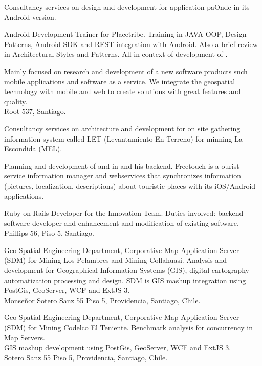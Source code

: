 \documentclass[11pt,letterpaper,roman]{moderncv}
\begin{document}
	 {\scd} {\paonde} {\stgo} {}
	{Consultancy services on design and development for application paOnde
in its Android version.} 

	 {\tchr} {\placetribe} {\stgo} {}
	{Android Development Trainer for Placetribe. Training in JAVA
	OOP, Design Patterns, Android SDK and REST integration with Android. Also a
	brief review in Architectural Styles and Patterns. All in context of development
	of \placetribeapp.}

	 {\cf} {\ingennia} {\stgo} {}
	{Mainly focused on research and development of a new software products
	such mobile applications and software as a service. We integrate the geospatial
	technology with mobile and web to create solutions with great features and
	quality. \\ Root 537, Santiago.}

	 {\scd} {\jobbitgames} {\stgo} {}
	{Consultancy services on architecture and development for on site
gathering information system called LET (Levantamiento En Terreno) for minning
La Escondida (MEL).} 

	 {\scd} {\mataveri} {\stgo} {}
	{Planning and development of \freetouchchile and \freetouchperu in
	\android and his backend.  Freetouch is a ourist service information manager and
	webservices that synchronizes information (pictures, localization, descriptions)
	about touristic places with its iOS/Android applications.}
	
	 {\se} {\multicaja} {\stgo} {}
	{Ruby on Rails Developer for the Innovation Team. Duties involved:
backend software developer and enhancement and modification of existing
software. \\
	Phillips 56, Piso 5, Santiago.}

	 {\se} {\ikom} {\stgo} {} {Geo Spatial Engineering
Department, Corporative Map Application Server (SDM) for Mining Los Pelambres
and Mining Collahuasi.  Analysis and development for Geographical Information
Systems (GIS), digital cartography automatization processing and design.  SDM is
GIS mashup integration using PostGis, GeoServer, WCF and ExtJS 3. \\ Monse\~nor
Sotero Sanz 55 Piso 5, Providencia, Santiago, Chile.}

	 {\intership} {\ikom} {\stgo} {}
	{Geo Spatial Engineering Department, Corporative Map Application Server
	(SDM) for  Mining Codelco El Teniente.  Benchmark analysis for concurrency in
	Map Servers. \\
	GIS mashup development using PostGis, GeoServer, WCF and ExtJS 3. \\ Sotero Sanz
	55 Piso 5, Providencia, Santiago, Chile.}
\end{document}

